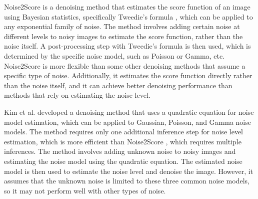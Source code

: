 \documentclass[conference]{IEEEtran}
\begin{document}
Noise2Score \cite{kim2021noise2score} is a denoising method that estimates the score function of an image using Bayesian statistics, specifically Tweedie's formula \cite{efron2011tweedie}, which can be applied to any exponential family of noise. The method involves adding certain noise at different levels to noisy images to estimate the score function, rather than the noise itself. A post-processing step with Tweedie's formula is then used, which is determined by the specific noise model, such as Poisson or Gamma, etc.
Noise2Score is more flexible than some other denoising methods that assume a specific type of noise. Additionally, it estimates the score function directly rather than the noise itself, and it can achieve better denoising performance than methods that rely on estimating the noise level.

Kim et al. \cite{kim2022noise} developed a denoising method that uses a quadratic equation for noise model estimation, which can be applied to Gaussian, Poisson, and Gamma noise models. The method requires only one additional inference step for noise level estimation, which is more efficient than Noise2Score \cite{kim2021noise2score}, which requires multiple inferences. 
The method involves adding unknown noise to noisy images and estimating the noise model using the quadratic equation. The estimated noise model is then used to estimate the noise level and denoise the image.
However, it assumes that the unknown noise is limited to these three common noise models, so it may not perform well with other types of noise.
\end{document}
